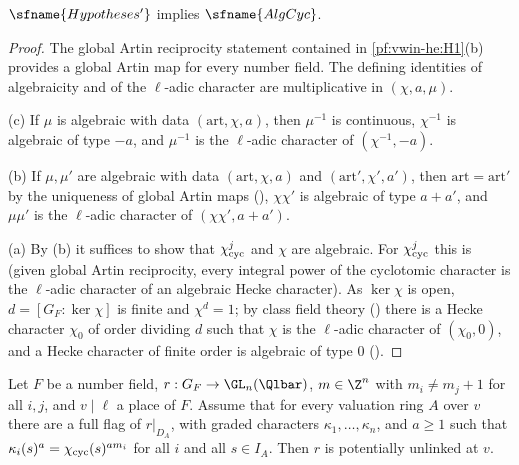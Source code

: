 \begin{proposition}\label{pf:modularity:algcyc}
$\sfname{Hypotheses'}$ implies $\sfname{AlgCyc}$.
\end{proposition}

\begin{proof}
The global Artin reciprocity statement contained in \ref{pf:vwin-he:H1}(b) provides a global Artin map for every number
field. The defining identities of algebraicity and of the $\ell$-adic character are multiplicative in $(\chi,a,\mu)$.

(c) If $\mu$ is algebraic with data $(\mathrm{art},\chi,a)$, then $\mu^{-1}$ is continuous, $\chi^{-1}$ is algebraic of
type $-a$, and $\mu^{-1}$ is the $\ell$-adic character of $(\chi^{-1},-a)$.

(b) If $\mu,\mu'$ are algebraic with data $(\mathrm{art},\chi,a)$ and $(\mathrm{art}',\chi',a')$, then
$\mathrm{art}=\mathrm{art}'$ by the uniqueness of global Artin maps (),
$\chi\chi'$ is algebraic of type $a+a'$, and $\mu\mu'$ is the $\ell$-adic character of $(\chi\chi',a+a')$.

(a) By (b) it suffices to show that $\chi_{\mathrm{cyc}}^j$ and $\chi$ are algebraic. For $\chi_{\mathrm{cyc}}^j$ this is
 (given global Artin reciprocity, every integral power of the
cyclotomic character is the $\ell$-adic character of an algebraic Hecke character). As $\ker\chi$ is open,
$d=[G_F:\ker\chi]$ is finite and $\chi^d=1$; by class field theory \cite{Neukirch1999}
() there is a Hecke character $\chi_0$ of order
dividing $d$ such that $\chi$ is the $\ell$-adic character of $(\chi_0,0)$, and a Hecke character of finite order is
algebraic of type $0$ ().
\end{proof}

\begin{lemma}\label{pf:modularity:potflag}
Let $F$ be a number field, $r:G_F\to\GL_n(\Qlbar)$, $m\in\Z^n$ with $m_i\ne m_j+1$ for all $i,j$, and $v\mid\ell$ a place of
$F$. Assume that for every valuation ring $A$ over $v$ there are a full flag of $r|_{D_A}$, with graded characters
$\kappa_1,\dots,\kappa_n$, and $a\ge1$ such that $\kappa_i(s)^a=\chi_{\mathrm{cyc}}(s)^{am_i}$ for all $i$ and all $s\in I_A$.
Then $r$ is potentially unlinked at $v$.
\end{lemma}

